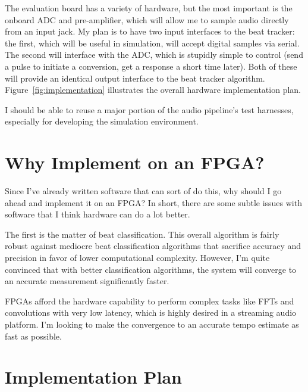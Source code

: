 \documentclass[letterpaper]{article}
\begin{document}
    The evaluation board has a variety of hardware, but the most important is
    the onboard ADC and pre-amplifier, which will allow me to sample audio
    directly from an input jack.  My plan is to have two input interfaces to
    the beat tracker: the first, which will be useful in simulation, will
    accept digital samples via serial.  The second will interface with the ADC,
    which is stupidly simple to control (send a pulse to initiate a conversion,
    get a response a short time later).  Both of these will provide an
    identical output interface to the beat tracker algorithm.
    Figure~\ref{fig:implementation} illustrates the overall hardware
    implementation plan.

    I should be able to reuse a major portion of the audio pipeline's test
    harnesses, especially for developing the simulation environment.


\section{Why Implement on an FPGA?}

    Since I've already written software that can sort of do this, why should I
    go ahead and implement it on an FPGA?  In short, there are some subtle
    issues with software that I think hardware can do a lot better.

    The first is the matter of beat classification.  This overall algorithm is
    fairly robust against mediocre beat classification algorithms that
    sacrifice accuracy and precision in favor of lower computational
    complexity.  However, I'm quite convinced that with better classification
    algorithms, the system will converge to an accurate measurement
    significantly faster.

    FPGAs afford the hardware capability to perform complex tasks like FFTs and
    convolutions with very low latency, which is highly desired in a streaming
    audio platform.  I'm looking to make the convergence to an accurate tempo
    estimate as fast as possible. 

    
\section{Implementation Plan}
    
\end{document}
